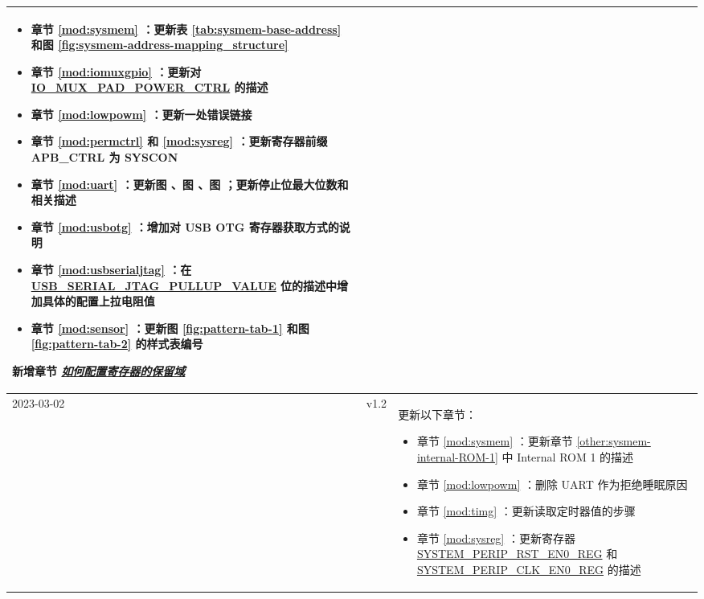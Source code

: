 \begin{longtable}[l]{ | m{2cm} | m{1.5cm} | m{12cm} | }
\begin{itemize}
        \item 章节 \ref{mod:sysmem} \textit{\nameref{mod:sysmem}}：更新表 \ref{tab:sysmem-base-address} 和图 \ref{fig:sysmem-address-mapping_structure} %
        \item 章节 \ref{mod:iomuxgpio} \textit{\nameref{mod:iomuxgpio}}：更新对 \hyperref[fielddesc:IOMUXPADPOWERCTRL]{IO\_MUX\_PAD\_POWER\_CTRL} 的描述 %
        \item 章节 \ref{mod:lowpowm} \textit{\nameref{mod:lowpowm}}：更新一处错误链接 %
        \item 章节 \ref{mod:permctrl} \textit{\nameref{mod:permctrl}} 和 \ref{mod:sysreg} \textit{\nameref{mod:sysreg}}：更新寄存器前缀 APB\_CTRL 为 SYSCON %
        \item 章节 \ref{mod:uart} \textit{\nameref{mod:uart}}：更新图 \nameref{fig:uart-arch-overview}、图 \nameref{fig:one-uart-structure}、图 \nameref{fig:uart-flow-control}；更新停止位最大位数和相关描述 %
        \item 章节 \ref{mod:usbotg} \textit{\nameref{mod:usbotg}}：增加对 USB OTG 寄存器获取方式的说明
        \item 章节 \ref{mod:usbserialjtag} \textit{\nameref{mod:usbserialjtag}}：在 \hyperref[fielddesc:USBSERIALJTAGPULLUPVALUE]{USB\_SERIAL\_JTAG\_PULLUP\_VALUE} 位的描述中增加具体的配置上拉电阻值
        \item 章节 \ref{mod:sensor} \textit{\nameref{mod:sensor}}：更新图 \ref{fig:pattern-tab-1} 和图 \ref{fig:pattern-tab-2} 的样式表编号
    \end{itemize}
    新增章节 \hyperref[programming-reserved-field]{\textit{如何配置寄存器的保留域}}
    \\\hline
    2023-03-02         & v1.2  &
    更新以下章节：
    \begin{itemize}
        \item 章节 \ref{mod:sysmem} \textit{\nameref{mod:sysmem}}：更新章节 \ref{other:sysmem-internal-ROM-1} \textit{\nameref{other:sysmem-internal-ROM-1}} 中 Internal ROM 1 的描述
        \item 章节 \ref{mod:lowpowm} \textit{\nameref{mod:lowpowm}}：删除 UART 作为拒绝睡眠原因 %
        \item 章节 \ref{mod:timg} \textit{\nameref{mod:timg}}：更新读取定时器值的步骤 %
        \item 章节 \ref{mod:sysreg} \textit{\nameref{mod:sysreg}}：更新寄存器 \newline \hyperref[regdesc:SYSTEMPERIPRSTEN0REG]{SYSTEM\_PERIP\_RST\_EN0\_REG} 和 \hyperref[regdesc:SYSTEMPERIPCLKEN0REG]{SYSTEM\_PERIP\_CLK\_EN0\_REG} 的描述 %

\end{itemize}
\end{longtable}
